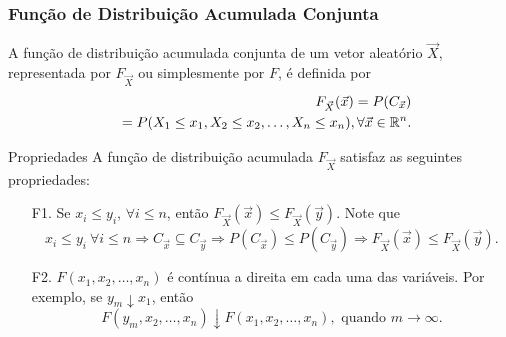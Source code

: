 \begin{frame}
\frametitle{{Função de Distribuição Acumulada Conjunta}}

\begin{defi}
A função de distribuição acumulada conjunta de um vetor aleatório
$\vec{X}$, representada por $F_{\vec{X}}$ ou simplesmente por $F$, é
definida por
%
\begin{eqnarray}
& & F_{\vec{X}}(\vec{x})=P(C_{\vec{x}})\nonumber \\
& & =P(X_1\leq x_1, X_2\leq x_2,\ldots,X_n\leq x_n), \forall \vec{x}\in \mathbb{R}^n.\nonumber
\end{eqnarray}
\end{defi}
\begin{block}{{Propriedades}}
A função de distribuição acumulada $F_{\vec{X}}$ satisfaz as seguintes
propriedades:
\begin{enumerate}
\item[F1.] Se $x_i\leq y_i$, $\forall i\leq n$, então $F_{\vec{X}}(\vec{x})\leq F_{\vec{X}}(\vec{y})$. Note que
$$x_i\leq y_i \ \forall i\leq n \Rightarrow C_{\vec{x}}\subseteq C_{\vec{y}}
\Rightarrow P(C_{\vec{x}})\leq P(C_{\vec{y}})\nonumber 
 \Rightarrow F_{\vec{X}}(\vec{x})\leq F_{\vec{X}}(\vec{y}).\nonumber
$$

\item[F2.] $F(x_1,x_2,\ldots,x_n)$ é contínua a direita em cada uma das variáveis. Por exemplo, se $y_m\downarrow x_1$, então
$$F(y_m,x_2,\ldots,x_n)\downarrow F(x_1,x_2,\ldots,x_n), \mbox{ quando }m\rightarrow\infty.$$

\end{enumerate}
\end{block}
\end{frame}

